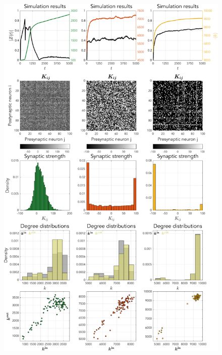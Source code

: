 \begin{frame}
\begin{figure}[H]
\includegraphics[trim=0cm 7.2cm 0cm 26cm, clip=true, height = 0.45\textheight]{../Figures/Learning/STDP.pdf}
\label{fig:STDP}
\end{figure}
\end{frame}

